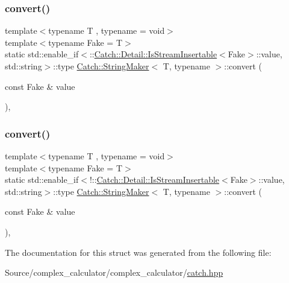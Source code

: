 \subsubsection{\texorpdfstring{convert()}{convert()}\hspace{0.1cm}{\footnotesize\ttfamily [1/2]}}
{\footnotesize\ttfamily template$<$typename T , typename  = void$>$ \\
template$<$typename Fake  = T$>$ \\
static std\+::enable\+\_\+if$<$\+::\mbox{\hyperlink{class_catch_1_1_detail_1_1_is_stream_insertable}{Catch\+::\+Detail\+::\+Is\+Stream\+Insertable}}$<$Fake$>$\+::value, std\+::string$>$\+::type \mbox{\hyperlink{struct_catch_1_1_string_maker}{Catch\+::\+String\+Maker}}$<$ T, typename $>$\+::convert (\begin{DoxyParamCaption}\item[{const Fake \&}]{value }\end{DoxyParamCaption})\hspace{0.3cm}{\ttfamily [inline]}, {\ttfamily [static]}}

\mbox{\label{struct_catch_1_1_string_maker_a68bb548de0e5ad364228b1ca3dd2f561}} 
\subsubsection{\texorpdfstring{convert()}{convert()}\hspace{0.1cm}{\footnotesize\ttfamily [2/2]}}
{\footnotesize\ttfamily template$<$typename T , typename  = void$>$ \\
template$<$typename Fake  = T$>$ \\
static std\+::enable\+\_\+if$<$!\+::\mbox{\hyperlink{class_catch_1_1_detail_1_1_is_stream_insertable}{Catch\+::\+Detail\+::\+Is\+Stream\+Insertable}}$<$Fake$>$\+::value, std\+::string$>$\+::type \mbox{\hyperlink{struct_catch_1_1_string_maker}{Catch\+::\+String\+Maker}}$<$ T, typename $>$\+::convert (\begin{DoxyParamCaption}\item[{const Fake \&}]{value }\end{DoxyParamCaption})\hspace{0.3cm}{\ttfamily [inline]}, {\ttfamily [static]}}



The documentation for this struct was generated from the following file\+:\begin{DoxyCompactItemize}
\item 
Source/complex\+\_\+calculator/complex\+\_\+calculator/\mbox{\hyperlink{catch_8hpp}{catch.\+hpp}}\end{DoxyCompactItemize}
